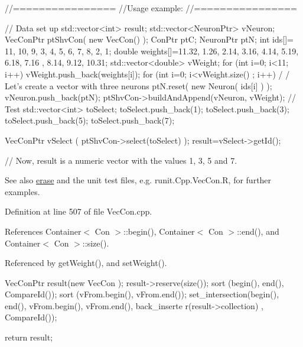 \begin{DoxyCode}
        //================
        //Usage example:
        //================

        // Data set up
                std::vector<int> result;
                std::vector<NeuronPtr> vNeuron;
                VecConPtr       ptShvCon( new VecCon() );
                ConPtr  ptC;
                NeuronPtr ptN;
                int ids[]= {11, 10, 9, 3, 4, 5, 6, 7, 8, 2, 1};
                double weights[]={11.32, 1.26, 2.14, 3.16, 4.14, 5.19, 6.18, 7.16
      , 8.14, 9.12, 10.31};
                std::vector<double> vWeight;
                for (int i=0; i<11; i++) {
                        vWeight.push_back(weights[i]);
                }
                for (int i=0; i<vWeight.size() ; i++) {                         /
      / Let's create a vector with three neurons
                        ptN.reset( new Neuron( ids[i] ) );
                        vNeuron.push_back(ptN);
                }
                ptShvCon->buildAndAppend(vNeuron, vWeight);
                // Test
                std::vector<int> toSelect;
                toSelect.push_back(1);
                toSelect.push_back(3);
                toSelect.push_back(5);
                toSelect.push_back(7);

                VecConPtr  vSelect (  ptShvCon->select(toSelect)  );
                result=vSelect->getId();

                // Now, result is a numeric vector with the values 1, 3, 5 and 7.
      
\end{DoxyCode}


\begin{DoxySeeAlso}{See also}
\hyperlink{class_vec_con_a4f6a58d420e063b51157e805dfb0b34c}{erase} and the unit test files, e.g. runit.Cpp.VecCon.R, for further examples. 
\end{DoxySeeAlso}


Definition at line 507 of file VecCon.cpp.



References Container$<$ Con $>$::begin(), Container$<$ Con $>$::end(), and Container$<$ Con $>$::size().



Referenced by getWeight(), and setWeight().


\begin{DoxyCode}
                                               {
        VecConPtr result(new VecCon );
        result->reserve(size());
        sort (begin(), end(), CompareId());
        sort (vFrom.begin(), vFrom.end());
        set_intersection(begin(), end(), vFrom.begin(), vFrom.end(), back_inserte
      r(result->collection) , CompareId());

        return result;
}
\end{DoxyCode}


